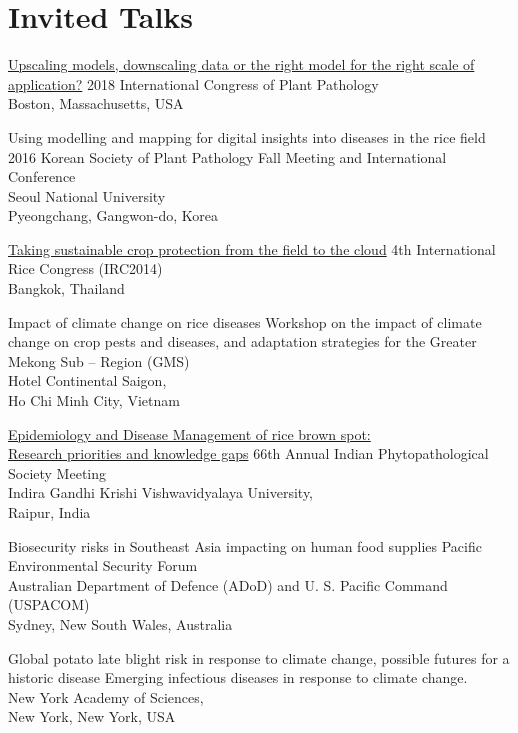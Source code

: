 \section*{Invited Talks}
\begin{entrylist}
  {\href{https://www.apsnet.org/publications/Webinars/Pages/2018videos.aspx?LID=Paper4005.mp4}{Upscaling models, downscaling data or the right model for the right scale of application?}}
  {}
  {2018 International Congress of Plant Pathology\\Boston, Massachusetts, USA}

 	{Using modelling and mapping for digital insights into diseases in the rice field}
 	{}
 	{2016 Korean Society of Plant Pathology Fall Meeting and International Conference\\Seoul National University\\Pyeongchang, Gangwon-do, Korea}

	{\href{http://figshare.com/articles/Taking_Sustainable_Crop_Protection_From_the_Field_to_the_Cloud/1225800}{Taking sustainable crop protection from the field to the cloud}}
	{}
	{4th International Rice Congress (IRC2014)\\Bangkok, Thailand}

	{Impact of climate change on rice diseases}
	{}
	{Workshop on the impact of climate change on crop pests and diseases, and adaptation strategies for the Greater Mekong Sub -- Region (GMS)\\Hotel Continental Saigon,\\Ho Chi Minh City, Vietnam}

	{\href{http://figshare.com/articles/IPS_2014/1037569}{Epidemiology and Disease Management of rice brown spot:\\Research priorities and knowledge gaps}}
	{}
	{66th Annual Indian Phytopathological Society Meeting\\Indira Gandhi Krishi Vishwavidyalaya University,\\Raipur, India}

	{Biosecurity risks in Southeast Asia impacting on human food supplies}
	{}
	{Pacific Environmental Security Forum\\Australian Department of Defence (ADoD) and U. S. Pacific Command (USPACOM)\\Sydney, New South Wales, Australia}

	{Global potato late blight risk in response to climate change, possible futures for a historic disease}
  	{}
  	{Emerging infectious diseases in response to climate change.\\New York Academy of Sciences,\\New York, New York, USA}
\end{entrylist}
